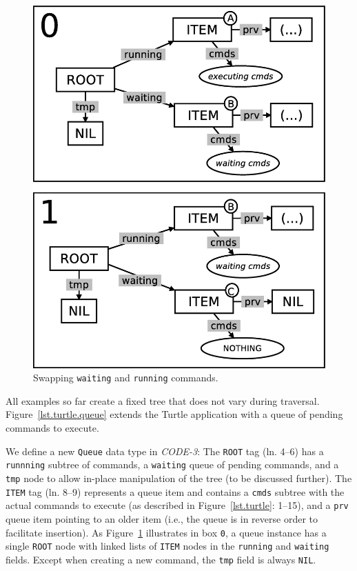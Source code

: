 \documentclass{sig-alternate}
\newcommand{\code}[1] {{\small{\texttt{#1}}}}
\begin{document}
\setcounter{figure}{8}
\begin{figure}[h!]
\centering
\includegraphics[scale=0.24]{queue-fig-1.eps}
\caption{
Swapping \code{waiting} and \code{running} commands.
\label{fig.queue-1}
}
\end{figure}

All examples so far create a fixed tree that does not vary during traversal.
%
Figure~\ref{lst.turtle.queue} extends the Turtle application with a queue of 
pending commands to execute.

We define a new \code{Queue} data type in \emph{CODE-3}:
The \code{ROOT} tag (ln. 4--6) has a \code{runnning} subtree of commands, a 
\code{waiting} queue of pending commands, and a \code{tmp} node to allow 
in-place manipulation of the tree (to be discussed further).
%
The \code{ITEM} tag (ln. 8--9) represents a queue item and contains a 
\code{cmds} subtree with the actual commands to execute (as described in 
Figure~\ref{lst.turtle}: 1--15), and a \code{prv} queue item pointing to an 
older item (i.e., the queue is in reverse order to facilitate insertion).
%
As Figure~\ref{fig.queue-1} illustrates in box \code{0}, a queue instance has a 
single \code{ROOT} node with linked lists of \code{ITEM} nodes in the 
\code{running} and \code{waiting} fields.
Except when creating a new command, the \code{tmp} field is always \code{NIL}.
\end{document}
